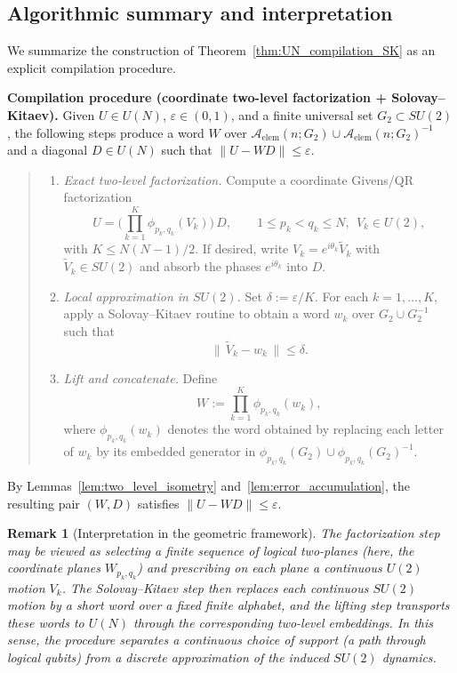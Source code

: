 \documentclass[10pt,a4paper]{amsart}
\newtheorem{remark}{Remark}
\begin{document}
\subsection{Algorithmic summary and interpretation}
\label{subsec:algorithmic_summary}

We summarize the construction of Theorem~\ref{thm:UN_compilation_SK} as an explicit compilation procedure.

\medskip
\noindent\textbf{Compilation procedure (coordinate two-level factorization + Solovay--Kitaev).}
Given $U\in U(N)$, $\varepsilon\in(0,1)$, and a finite universal set $G_2\subset SU(2)$, the following steps produce
a word $W$ over $\mathcal{A}_{\mathrm{elem}}(n;G_2)\cup\mathcal{A}_{\mathrm{elem}}(n;G_2)^{-1}$ and a diagonal $D\in U(N)$ such that
$\|U-WD\|\le \varepsilon$.

\begin{quote}
\begin{enumerate}
\item \emph{Exact two-level factorization.}
Compute a coordinate Givens/QR factorization
\[
U=\Big(\prod_{k=1}^{K}\phi_{p_k,q_k}(V_k)\Big)\,D,
\qquad 1\le p_k<q_k\le N,\ \ V_k\in U(2),
\]
with $K\le N(N-1)/2$.
If desired, write $V_k=e^{i\theta_k}\widetilde V_k$ with $\widetilde V_k\in SU(2)$ and absorb the phases $e^{i\theta_k}$ into $D$.

\item \emph{Local approximation in $SU(2)$.}
Set $\delta:=\varepsilon/K$.
For each $k=1,\dots,K$, apply a Solovay--Kitaev routine to obtain a word $w_k$ over $G_2\cup G_2^{-1}$ such that
\[
\|\,\widetilde V_k-w_k\,\|\le \delta.
\]

\item \emph{Lift and concatenate.}
Define
\[
W:=\prod_{k=1}^{K}\phi_{p_k,q_k}(w_k),
\]
where $\phi_{p_k,q_k}(w_k)$ denotes the word obtained by replacing each letter of $w_k$ by its embedded generator in
$\phi_{p_k,q_k}(G_2)\cup \phi_{p_k,q_k}(G_2)^{-1}$.
\end{enumerate}
\end{quote}

\noindent
By Lemmas~\ref{lem:two_level_isometry} and~\ref{lem:error_accumulation}, the resulting pair $(W,D)$ satisfies $\|U-WD\|\le\varepsilon$.
\medskip

\begin{remark}[Interpretation in the geometric framework]
The factorization step may be viewed as selecting a finite sequence of logical two-planes (here, the coordinate planes
$W_{p_k,q_k}$) and prescribing on each plane a continuous $U(2)$ motion $V_k$. The Solovay--Kitaev step then replaces each
continuous $SU(2)$ motion by a short word over a fixed finite alphabet, and the lifting step transports these words to $U(N)$ through
the corresponding two-level embeddings. In this sense, the procedure separates a \emph{continuous} choice of support (a path through
logical qubits) from a \emph{discrete} approximation of the induced $SU(2)$ dynamics.
\end{remark}
\end{document}
